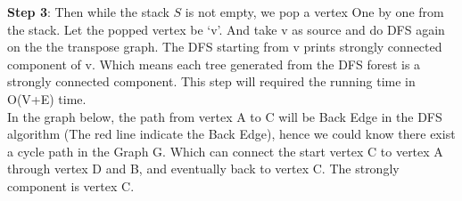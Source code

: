 \documentclass{article}
\begin{document}
\begin{center}
\end{center}


\noindent \textbf{Step 3}: Then while the stack $S$ is not empty, we pop a vertex One by one from the stack. Let the popped vertex be ‘v’. And take v as source and do DFS again on the the transpose graph. The DFS starting from v prints strongly connected component of v. Which means each tree generated from the DFS forest is a strongly connected component. This step will required the running time in O(V+E) time.\\

\noindent In the graph below, the path from vertex A to C will be Back Edge in the DFS algorithm (The red line indicate the Back Edge), hence we could know there exist a cycle path in the Graph G. Which can connect the start vertex C to vertex A through  vertex D and B, and eventually back to vertex C. The strongly component is vertex C.
\end{document}
